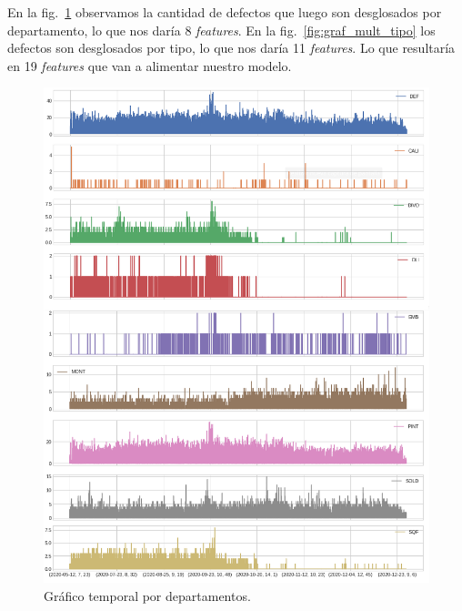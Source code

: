 \documentclass[a4paper,12pt]{article}
\begin{document}
En la fig.~\ref{fig:graf_mult_dpto} observamos la cantidad de defectos que luego son desglosados por departamento, lo que nos daría 8 \textit{features}. En la fig.~\ref{fig:graf_mult_tipo} los defectos son desglosados por tipo, lo que nos daría 11 \textit{features}. Lo que resultaría en 19 \textit{features} que van a alimentar nuestro modelo.

\begin{figure}[H]
	\begin{center}
	\includegraphics[width=1\textwidth]{multi_dpto.png}
  	\caption{Gráfico temporal por departamentos.}
  	\label{fig:graf_mult_dpto}
  	\end{center}
\end{figure}
\end{document}
